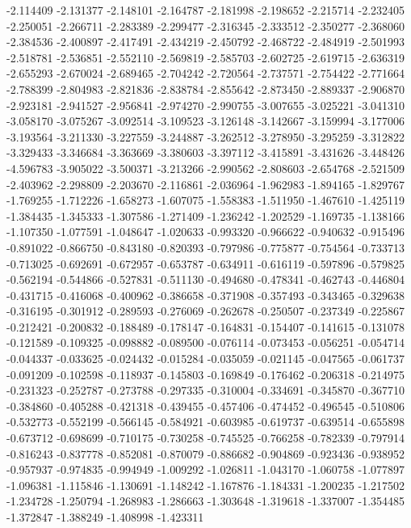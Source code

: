 -2.114409
-2.131377
-2.148101
-2.164787
-2.181998
-2.198652
-2.215714
-2.232405
-2.250051
-2.266711
-2.283389
-2.299477
-2.316345
-2.333512
-2.350277
-2.368060
-2.384536
-2.400897
-2.417491
-2.434219
-2.450792
-2.468722
-2.484919
-2.501993
-2.518781
-2.536851
-2.552110
-2.569819
-2.585703
-2.602725
-2.619715
-2.636319
-2.655293
-2.670024
-2.689465
-2.704242
-2.720564
-2.737571
-2.754422
-2.771664
-2.788399
-2.804983
-2.821836
-2.838784
-2.855642
-2.873450
-2.889337
-2.906870
-2.923181
-2.941527
-2.956841
-2.974270
-2.990755
-3.007655
-3.025221
-3.041310
-3.058170
-3.075267
-3.092514
-3.109523
-3.126148
-3.142667
-3.159994
-3.177006
-3.193564
-3.211330
-3.227559
-3.244887
-3.262512
-3.278950
-3.295259
-3.312822
-3.329433
-3.346684
-3.363669
-3.380603
-3.397112
-3.415891
-3.431626
-3.448426
-4.596783
-3.905022
-3.500371
-3.213266
-2.990562
-2.808603
-2.654768
-2.521509
-2.403962
-2.298809
-2.203670
-2.116861
-2.036964
-1.962983
-1.894165
-1.829767
-1.769255
-1.712226
-1.658273
-1.607075
-1.558383
-1.511950
-1.467610
-1.425119
-1.384435
-1.345333
-1.307586
-1.271409
-1.236242
-1.202529
-1.169735
-1.138166
-1.107350
-1.077591
-1.048647
-1.020633
-0.993320
-0.966622
-0.940632
-0.915496
-0.891022
-0.866750
-0.843180
-0.820393
-0.797986
-0.775877
-0.754564
-0.733713
-0.713025
-0.692691
-0.672957
-0.653787
-0.634911
-0.616119
-0.597896
-0.579825
-0.562194
-0.544866
-0.527831
-0.511130
-0.494680
-0.478341
-0.462743
-0.446804
-0.431715
-0.416068
-0.400962
-0.386658
-0.371908
-0.357493
-0.343465
-0.329638
-0.316195
-0.301912
-0.289593
-0.276069
-0.262678
-0.250507
-0.237349
-0.225867
-0.212421
-0.200832
-0.188489
-0.178147
-0.164831
-0.154407
-0.141615
-0.131078
-0.121589
-0.109325
-0.098882
-0.089500
-0.076114
-0.073453
-0.056251
-0.054714
-0.044337
-0.033625
-0.024432
-0.015284
-0.035059
-0.021145
-0.047565
-0.061737
-0.091209
-0.102598
-0.118937
-0.145803
-0.169849
-0.176462
-0.206318
-0.214975
-0.231323
-0.252787
-0.273788
-0.297335
-0.310004
-0.334691
-0.345870
-0.367710
-0.384860
-0.405288
-0.421318
-0.439455
-0.457406
-0.474452
-0.496545
-0.510806
-0.532773
-0.552199
-0.566145
-0.584921
-0.603985
-0.619737
-0.639514
-0.655898
-0.673712
-0.698699
-0.710175
-0.730258
-0.745525
-0.766258
-0.782339
-0.797914
-0.816243
-0.837778
-0.852081
-0.870079
-0.886682
-0.904869
-0.923436
-0.938952
-0.957937
-0.974835
-0.994949
-1.009292
-1.026811
-1.043170
-1.060758
-1.077897
-1.096381
-1.115846
-1.130691
-1.148242
-1.167876
-1.184331
-1.200235
-1.217502
-1.234728
-1.250794
-1.268983
-1.286663
-1.303648
-1.319618
-1.337007
-1.354485
-1.372847
-1.388249
-1.408998
-1.423311
